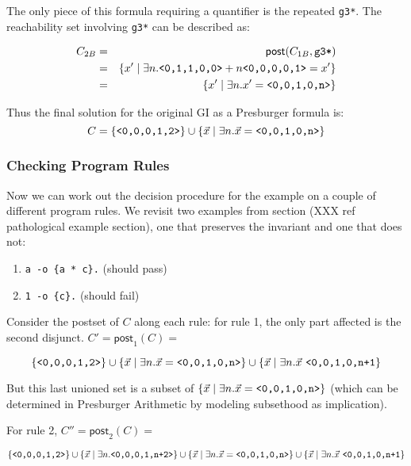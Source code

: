 \documentclass[fullpage, 11pt]{article}
\begin{document}
The only piece of this formula requiring a quantifier is the repeated
\verb|g3*|. The reachability set involving \verb|g3*| can be described as:

\begin{eqnarray*}
  C_{2B} &=& \mathsf{post}(C_{1B}, \verb|g3*|)\\
         &=& \{ 
              x' \mid
                \exists n. \verb|<0,1,1,0,0>| + n\verb|<0,0,0,0,1>| = x'
              \}\\
        &=& \{
              x' \mid
                \exists n. x' = \verb|<0,0,1,0,n>| \}
\end{eqnarray*}

Thus the final solution for the original GI as a Presburger formula is:
\[
C = \{ \verb|<0,0,0,1,2>| \} \cup
    \{\vec{x} \mid \exists n. \vec{x} = \verb|<0,0,1,0,n>|\}
\]


\subsubsection*{Checking Program Rules}

Now we can work out the decision procedure for the example on a couple of
different program rules. We revisit two examples from section (XXX ref
pathological example section), one that preserves the invariant and one
that does not:

\begin{enumerate}
\item \verb|a -o {a * c}.| (should pass)
\item \verb|1 -o {c}.| (should fail)
\end{enumerate}

Consider the postset of $C$ along each rule: for rule 1, the only part
affected is the second disjunct. $C' = \mathsf{post}_1(C) =$

\[
    \{ \verb|<0,0,0,1,2>| \} \cup
    \{\vec{x} \mid \exists n. \vec{x} = \verb|<0,0,1,0,n>|\} \cup
    \{\vec{x} \mid \exists n. \vec{x} \ \verb|<0,0,1,0,n+1|\}
\]

But this last unioned set is a subset of 
$\{\vec{x} \mid \exists n. \vec{x} = \verb|<0,0,1,0,n>|\}$
(which can be determined in Presburger Arithmetic by modeling subsethood as
implication).

For rule 2, $C'' = \mathsf{post}_2(C) =$

\[
    \{ \verb|<0,0,0,1,2>| \} \cup
    \{\vec{x} \mid \exists n. \verb|<0,0,0,1,n+2>| \} \cup
    \{\vec{x} \mid \exists n. \vec{x} = \verb|<0,0,1,0,n>|\} \cup
    \{\vec{x} \mid \exists n. \vec{x} \ \verb|<0,0,1,0,n+1|\}
\]
\end{document}
